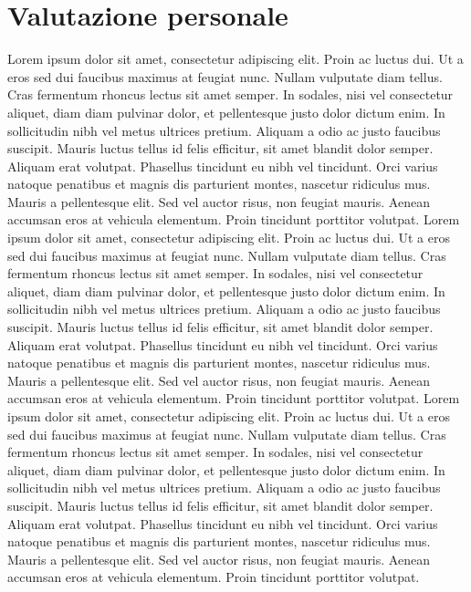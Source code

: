 \section{Valutazione personale}
Lorem ipsum dolor sit amet, consectetur adipiscing elit. Proin ac luctus dui. Ut a eros sed dui faucibus maximus at feugiat nunc. Nullam vulputate diam tellus. Cras fermentum rhoncus lectus sit amet semper. In sodales, nisi vel consectetur aliquet, diam diam pulvinar dolor, et pellentesque justo dolor dictum enim. In sollicitudin nibh vel metus ultrices pretium. Aliquam a odio ac justo faucibus suscipit. Mauris luctus tellus id felis efficitur, sit amet blandit dolor semper. Aliquam erat volutpat. Phasellus tincidunt eu nibh vel tincidunt. Orci varius natoque penatibus et magnis dis parturient montes, nascetur ridiculus mus. Mauris a pellentesque elit. Sed vel auctor risus, non feugiat mauris. Aenean accumsan eros at vehicula elementum. Proin tincidunt porttitor volutpat.
Lorem ipsum dolor sit amet, consectetur adipiscing elit. Proin ac luctus dui. Ut a eros sed dui faucibus maximus at feugiat nunc. Nullam vulputate diam tellus. Cras fermentum rhoncus lectus sit amet semper. In sodales, nisi vel consectetur aliquet, diam diam pulvinar dolor, et pellentesque justo dolor dictum enim. In sollicitudin nibh vel metus ultrices pretium. Aliquam a odio ac justo faucibus suscipit. Mauris luctus tellus id felis efficitur, sit amet blandit dolor semper. Aliquam erat volutpat. Phasellus tincidunt eu nibh vel tincidunt. Orci varius natoque penatibus et magnis dis parturient montes, nascetur ridiculus mus. Mauris a pellentesque elit. Sed vel auctor risus, non feugiat mauris. Aenean accumsan eros at vehicula elementum. Proin tincidunt porttitor volutpat.
Lorem ipsum dolor sit amet, consectetur adipiscing elit. Proin ac luctus dui. Ut a eros sed dui faucibus maximus at feugiat nunc. Nullam vulputate diam tellus. Cras fermentum rhoncus lectus sit amet semper. In sodales, nisi vel consectetur aliquet, diam diam pulvinar dolor, et pellentesque justo dolor dictum enim. In sollicitudin nibh vel metus ultrices pretium. Aliquam a odio ac justo faucibus suscipit. Mauris luctus tellus id felis efficitur, sit amet blandit dolor semper. Aliquam erat volutpat. Phasellus tincidunt eu nibh vel tincidunt. Orci varius natoque penatibus et magnis dis parturient montes, nascetur ridiculus mus. Mauris a pellentesque elit. Sed vel auctor risus, non feugiat mauris. Aenean accumsan eros at vehicula elementum. Proin tincidunt porttitor volutpat.